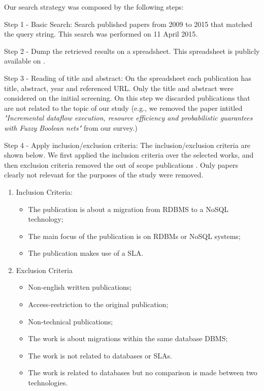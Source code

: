 \documentclass{article}
\begin{document}
Our search strategy was composed by the following steps:

Step 1 - Basic Search: Search published papers from 2009 to 2015 that matched the query string. This search was performed on 11 April 2015. 

Step 2 - Dump the retrieved results on a spreadsheet. This spreadsheet is publicly available on \cite{systematicMappingSpreadsheet}.

Step 3 - Reading of title and abstract: On the spreadsheet each publication has title, abstract, year and referenced URL. Only the title and abstract were considered on the initial screening. On this step we discarded publications that are not related to the topic of our study (e.g., we removed the paper intitled \textit{"Incremental dataflow execution, resource efficiency and probabilistic guarantees with Fuzzy Boolean nets"} from our survey.) 

Step 4 - Apply inclusion/exclusion criteria: The inclusion/exclusion criteria are shown below. We first applied the inclusion criteria over the selected works, and then exclusion criteria removed the out of scope publications . Only papers clearly not relevant for the purposes of the study were removed.

\begin{enumerate}
    \item Inclusion Criteria: 
    \begin{itemize}
      \item The publication is about a migration from RDBMS to a NoSQL technology;
      \item The main focus of the publication is on RDBMs or NoSQL systems;
      \item The publication makes use of a SLA.
    \end{itemize}
    \item Exclusion Criteria
	\begin{itemize}
    \item Non-english written publications;
		\item Access-restriction to the original publication;
		\item Non-technical publications;
    \item The work is about migrations within the same database DBMS;
    \item The work is not related to databases or SLAs.
    \item The work is related to databases but no comparison is made between two technologies.
    \end{itemize}
    
\end{enumerate}
\end{document}
